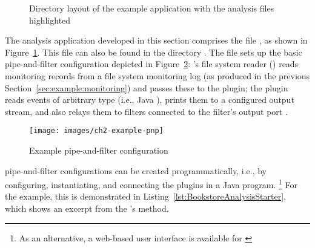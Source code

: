 \begin{figure}[H]
\begin{graybox}
\end{graybox}
\caption{Directory layout of the example application with the analysis files highlighted}
\label{lst:analysisExampleLayout}
\end{figure}

\noindent The analysis application developed in this section comprises the file %
, as shown in Figure~\ref{lst:analysisExampleLayout}. %
This file can also be found in the directory \dir{\manualInstrumentedBookstoreApplicationReleaseDirDistro{}/}.
The file sets up the basic pipe-and-filter configuration depicted in Figure~\ref{fig:example:ch2:pipe-and-filter}: %
\Kieker{}'s file system reader () reads monitoring records %
from a file system monitoring log (as produced in the previous Section~\ref{sec:example:monitoring}) %
and passes these to the  plugin; the  plugin %
reads events of arbitrary type (i.e., Java ), prints them to a %
configured output stream, and also relays them to filters connected to the %
filter's output port . %

\begin{figure}[h]
\texttt{[image: images/ch2-example-pnp]}
\caption{Example pipe-and-filter configuration}
\label{fig:example:ch2:pipe-and-filter}
\end{figure}

\enlargethispage{0.5cm}

\KiekerAnalysisPart{} pipe-and-filter configurations can %
be created programmatically, i.e., by configuring, instantiating, and %
connecting the plugins in a Java program.%
\footnote{As an alternative, a web-based user interface is available for \Kieker{} \cite{KiekerWebSite}} %
For the example, this is demonstrated in Listing~\ref{lst:BookstoreAnalysisStarter}, %
which shows an excerpt from the 's  %
method. %

